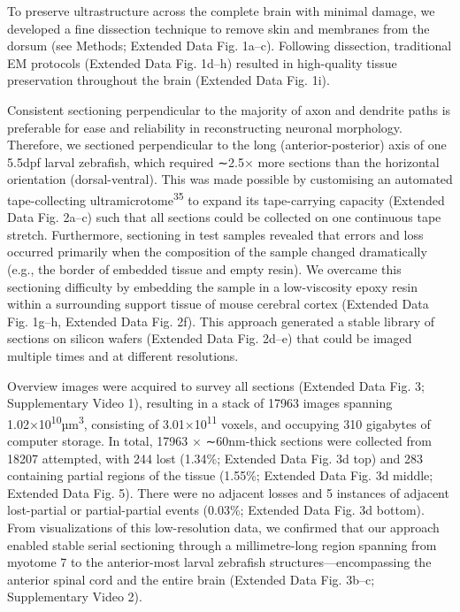 \documentclass{article}
\begin{document}
To preserve ultrastructure across the complete brain with minimal damage, we developed a fine dissection technique to remove skin and membranes from the dorsum (see Methods; Extended Data Fig. 1a–c). Following dissection, traditional EM protocols (Extended Data Fig. 1d–h) resulted in high-quality tissue preservation throughout the brain (Extended Data Fig. 1i).

Consistent sectioning perpendicular to the majority of axon and dendrite paths is preferable for ease and reliability in reconstructing neuronal morphology. Therefore, we sectioned perpendicular to the long (anterior-posterior) axis of one 5.5dpf larval zebrafish, which required ∼2.5× more sections than the horizontal orientation (dorsal-ventral). This was made possible by customising an automated tape-collecting ultramicrotome\textsuperscript{35} to expand its tape-carrying capacity (Extended Data Fig. 2a–c) such that all sections could be collected on one continuous tape stretch. Furthermore, sectioning in test samples revealed that errors and loss occurred primarily when the composition of the sample changed dramatically (e.g., the border of embedded tissue and empty resin). We overcame this sectioning difficulty by embedding the sample in a low-viscosity epoxy resin within a surrounding support tissue of mouse cerebral cortex (Extended Data Fig. 1g–h, Extended Data Fig. 2f). This approach generated a stable library of sections on silicon wafers (Extended Data Fig. 2d–e) that could be imaged multiple times and at different resolutions.

Overview images were acquired to survey all sections (Extended Data Fig. 3; Supplementary Video 1), resulting in a stack of 17963 images spanning 1.02×10\textsuperscript{10}µm\textsuperscript{3}, consisting of 3.01×10\textsuperscript{11} voxels, and occupying 310 gigabytes of computer storage. In total, 17963 × ∼60nm-thick sections were collected from 18207 attempted, with 244 lost (1.34\%; Extended Data Fig. 3d top) and 283 containing partial regions of the tissue (1.55\%; Extended Data Fig. 3d middle; Extended Data Fig. 5). There were no adjacent losses and 5 instances of adjacent lost-partial or partial-partial events (0.03\%; Extended Data Fig. 3d bottom). From visualizations of this low-resolution data, we confirmed that our approach enabled stable serial sectioning through a millimetre-long region spanning from myotome 7 to the anterior-most larval zebrafish structures—encompassing the anterior spinal cord and the entire brain (Extended Data Fig. 3b–c; Supplementary Video 2).
\end{document}
